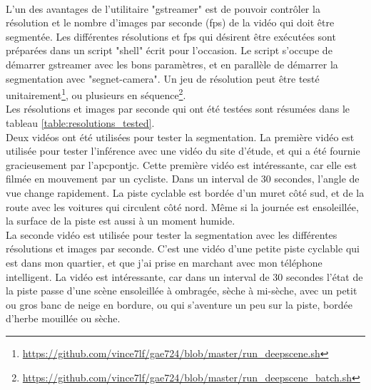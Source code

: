 \vspace{\baselineskip}
\\
\noindent L'un des avantages de l'utilitaire "gstreamer" est de pouvoir contrôler la résolution et le nombre d'images par seconde (\acrshort{fps}) de la vidéo qui doit être segmentée. Les différentes résolutions et \acrshort{fps} qui désirent être exécutées sont préparées dans un script "shell" écrit pour l'occasion. Le script s'occupe de démarrer gstreamer avec les bons paramètres, et en parallèle de démarrer la segmentation avec "segnet-camera". Un jeu de résolution peut être testé unitairement\footnote{\url{https://github.com/vince7lf/gae724/blob/master/run_deepscene.sh}}, ou plusieurs en séquence\footnote{\url{https://github.com/vince7lf/gae724/blob/master/run_deepscene_batch.sh}}. 
\vspace{\baselineskip}
\\
\noindent Les résolutions et images par seconde qui ont été testées sont résumées dans le tableau \ref{table:resolutions_tested}. 
\vspace{\baselineskip}
\\
\noindent Deux vidéos ont été utilisées pour tester la segmentation. La première vidéo est utilisée pour tester l'inférence avec une vidéo du site d'étude, et qui a été fournie gracieusement par l'\acrshort{apcpontjc}. Cette première vidéo est intéressante, car elle est filmée en mouvement par un cycliste. Dans un interval de 30 secondes, l'angle de vue change rapidement. La piste cyclable est bordée d'un muret côté sud, et de la route avec les voitures qui circulent côté nord. Même si la journée est ensoleillée, la surface de la piste est aussi à un moment humide.
\vspace{\baselineskip}
\\
\noindent La seconde vidéo est utilisée pour tester la segmentation avec les différentes résolutions et images par seconde. C'est une vidéo d'une petite piste cyclable qui est dans mon quartier, et que j'ai prise en marchant avec mon téléphone intelligent. La vidéo est intéressante, car dans un interval de 30 secondes l'état de la piste passe d'une scène ensoleillée à ombragée, sèche à mi-sèche, avec un petit ou gros banc de neige en bordure, ou qui s'aventure un peu sur la piste, bordée d'herbe mouillée ou sèche.
